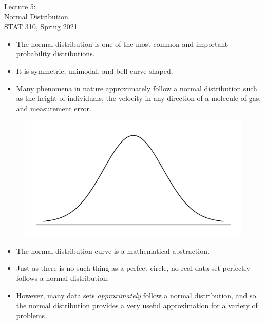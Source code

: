 \documentclass{beamer}
\begin{document}
\begin{frame}
\large
Lecture 5:\\
Normal Distribution\\
STAT 310, Spring 2021
\normalsize
\end{frame}

\begin{frame}
\begin{itemize}
\item The normal distribution is one of the most common and important probability distributions.
\vspace{5pt}
\item It is symmetric, unimodal, and bell-curve shaped.
\vspace{5pt}
\item Many phenomena in nature approximately follow a normal distribution such as the height of individuals, the velocity in any direction of a molecule of gas, and measurement error.
\end{itemize}
\begin{figure}
\includegraphics[scale=0.55]{figure/norm_draw}
\end{figure}
\end{frame}

\begin{frame}
\begin{itemize}
\item The normal distribution curve is a mathematical abstraction.
\vspace{5pt}
\item Just as there is no such thing as a perfect circle, no real data set perfectly follows a normal distribution.
\vspace{5pt}
\item However, many data sets \emph{approximately} follow a normal distribution, and so the normal distribution provides a very useful approximation for a variety of problems.
\end{itemize}
\end{frame}
\end{document}
